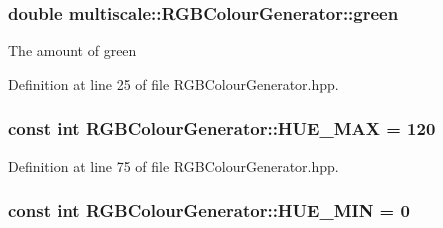 \hypertarget{classmultiscale_1_1RGBColourGenerator_ae8d94d24b109954be1da2a04c8ec9af7}{
\subsubsection[{green}]{\setlength{\rightskip}{0pt plus 5cm}double multiscale\-::\-R\-G\-B\-Colour\-Generator\-::green\hspace{0.3cm}{\ttfamily [private]}}}\label{classmultiscale_1_1RGBColourGenerator_ae8d94d24b109954be1da2a04c8ec9af7}
The amount of green 

Definition at line 25 of file R\-G\-B\-Colour\-Generator.\-hpp.

\hypertarget{classmultiscale_1_1RGBColourGenerator_a282d986019f3c02b46c122badf806cd0}{
\subsubsection[{H\-U\-E\-\_\-\-M\-A\-X}]{\setlength{\rightskip}{0pt plus 5cm}const int R\-G\-B\-Colour\-Generator\-::\-H\-U\-E\-\_\-\-M\-A\-X = 120\hspace{0.3cm}{\ttfamily [static]}}}\label{classmultiscale_1_1RGBColourGenerator_a282d986019f3c02b46c122badf806cd0}


Definition at line 75 of file R\-G\-B\-Colour\-Generator.\-hpp.

\hypertarget{classmultiscale_1_1RGBColourGenerator_ae31c47c9fccf50b3688728126040bc23}{
\subsubsection[{H\-U\-E\-\_\-\-M\-I\-N}]{\setlength{\rightskip}{0pt plus 5cm}const int R\-G\-B\-Colour\-Generator\-::\-H\-U\-E\-\_\-\-M\-I\-N = 0\hspace{0.3cm}{\ttfamily [static]}}}\label{classmultiscale_1_1RGBColourGenerator_ae31c47c9fccf50b3688728126040bc23}


